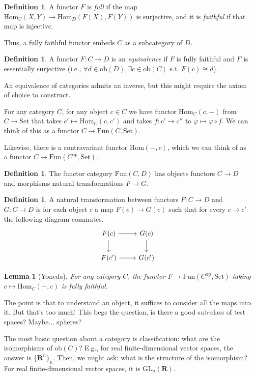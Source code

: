 \documentclass[12pt]{article}
\newtheorem{lemma}[theorem]{Lemma}
\theoremstyle{definition}
\newtheorem{definition}[theorem]{Definition}
\begin{document}
	\begin{definition}
		A functor $F$ is \emph{full} if the map $\text{Hom}_{C}(X,Y)\to\text{Hom}_{D}(F(X),F(Y))$ is surjective, and it is \emph{faithful} if that map is injective. 
	\end{definition}
	Thus, a fully faithful functor embeds $C$ as a subcategory of $D$. 
	\begin{definition}
		A functor $F:C\to D$ is an \emph{equivalence} if $F$ is fully faithful and $F$ is essentially surjective (i.e., $\forall d\in\text{ob}(D),\exists c\in\text{ob}(C)\text{ s.t. }F(c)\cong d$).
	\end{definition}
	An equivalence of categories admits an inverse, but this might require the axiom of choice to construct.  
	
	For any category $C$, for any object $c\in C$ we have functor $\text{Hom}_{C}(c,-)$ from $C\to\text{Set}$ that takes $c'\mapsto \text{Hom}_{C}(c,c')$ and takes $f:c'\to c''$ to $\varphi\mapsto \varphi\circ f$. We can think of this as a functor $C\to\text{Fun}(C,\text{Set})$. 
		
	Likewise, there is a contravariant functor $\text{Hom}(-,c)$, which we can think of as a functor $C\to\text{Fun}(C^{\text{op}},\text{Set})$.
	
	\begin{definition}
		The functor category $\text{Fun}(C,D)$ has objects functors $C\to D$ and morphisms natural transformations $F\to G$. 
	\end{definition} 
	\begin{definition}
		A natural transformation between functors $F:C\to D$ and $G:C\to D$ is for each object $c$ a map $F(c)\to G(c)$ such that for every  $c\to c'$ the following diagram commutes.
		$$\begin{tikzcd}
				F(c) \arrow[r] \arrow[d] & G(c) \arrow[d] \\
				F(c') \arrow[r]          & G(c')         
			\end{tikzcd}$$
	\end{definition}
	\begin{lemma}[Yoneda]
		For any category $C$, the functor $F\to\text{Fun}(C^{\text{op}},\text{Set})$ taking $c\mapsto\text{Hom}_{C}(-,c)$ is fully faithful. 
	\end{lemma}
	The point is that to understand an object, it suffices to consider all the maps into it. But that's too much! This begs the question, is there a good sub-class of test spaces? Maybe... spheres? 
	
	The most basic question about a category is classification: what are the isomorphisms of $\text{ob}(C)$? E.g., for real finite-dimensional vector spaces, the answer is $\{\mathbf{R}^{n}\}_{n}$. Then, we might ask: what is the structure of the isomorphism? For real finite-dimensional vector spaces, it is $\text{GL}_{n}(\mathbf{R})$.
	
\end{document}

